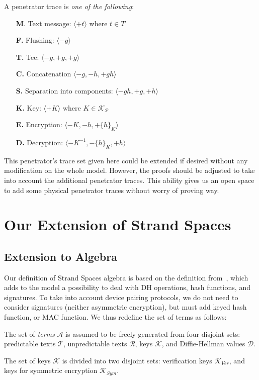 \begin{Definition} A penetrator trace is \emph{one of the following}:
\begin{itemize}
\item[\textbf{M}.] Text message: $\langle+t\rangle$ where $t \in T$
\item[\textbf{F.}] Flushing: $\langle-g\rangle$ 
\item[\textbf{T.}] Tee: $\langle-g,+g,+g\rangle$
\item[\textbf{C.}] Concatenation $\langle-g,-h,+gh\rangle$
\item[\textbf{S.}] Separation into components: $\langle-gh,+g,+h\rangle$
\item[\textbf{K.}] Key: $\langle+K\rangle$ where $K \in \mathcal{K_P}$
\item[\textbf{E.}] Encryption: $\langle-K,-h,+\{h\}_K\rangle$
\item[\textbf{D.}] Decryption: $\langle-K^{-1},-\{h\}_K,+h\rangle$
\end{itemize} 
\end{Definition}

This penetrator's trace set given here could be extended if desired without any modification on the whole model. However, the proofs should be adjusted to take into account the additional penetrator traces. This ability gives us an open space to add some physical penetrator traces without worry of proving way. 

\section{Our Extension of Strand Spaces}

\subsection{Extension to Algebra}

Our definition of Strand Spaces algebra is based on the definition from~\cite{1212716}, which adds to the model a possibility to deal with DH operations, hash functions, and signatures. To take into account device pairing protocols, we do not need to consider signatures (neither asymmetric encryption), but must add keyed hash function, or MAC function. We thus redefine the set of terms as follows:

\begin{Definition}
The set of \emph{terms} $\mathcal{A}$ is assumed to be freely generated from four disjoint sets: predictable texts $\mathcal{T}$, unpredictable texts $\mathcal{R}$, keys $\mathcal{K}$, and Diffie-Hellman values $\mathcal{D}$. 

The set of keys $\mathcal{K}$ is divided into two disjoint sets: verification keys $\mathcal{K}_{Ver}$, and keys for symmetric encryption $\mathcal{K}_{Sym}$.

\end{Definition}

